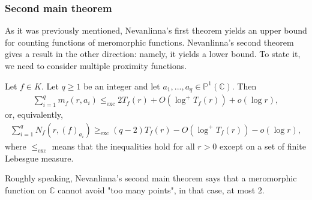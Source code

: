 \documentclass [11pt,reqno]{amsart}
\def\bC{{\mathbb{C}}}
\def\bP{{\mathbb{P}}}
\newcommand{\1}{\mathmybb{1}}
\def\setminus{\smallsetminus}
\begin{document}
\subsubsection{Second main theorem}

As it was previously mentioned, Nevanlinna's first theorem yields an upper bound for counting functions of meromorphic functions. Nevanlinna's second theorem gives a result in the other direction: namely, it yields a lower bound. To state it, we need to consider multiple proximity functions.

\begin{theorem}
\label{th:Nevanlinna_second_main_theorem}
Let $f\in K$. Let $q\geq 1$ be an integer and let $a_1,...,a_q\in\bP^1(\bC)$. Then
\begin{align*}
\displaystyle\sum_{i=1}^q m_f(r,a_i) \leq_{\text{exc}} 2T_{f}(r) + O(\log^+ T_f(r)) + o(\log r),
\end{align*}
or, equivalently,
\begin{align*}
\displaystyle\sum_{i=1}^q N_f(r,(f)_{a_i}) \geq_{\text{exc}} (q-2)T_f(r) - O(\log^+ T_f(r)) - o(\log r),
\end{align*}
where $\leq_{\text{exc}}$ means that the inequalities hold for all $r>0$ except on a set of finite Lebesgue measure.
\end{theorem}

Roughly speaking, Nevanlinna's second main theorem says that a meromorphic function on $\bC$ cannot avoid "too many points", in that case, at most $2$. 
\end{document}
